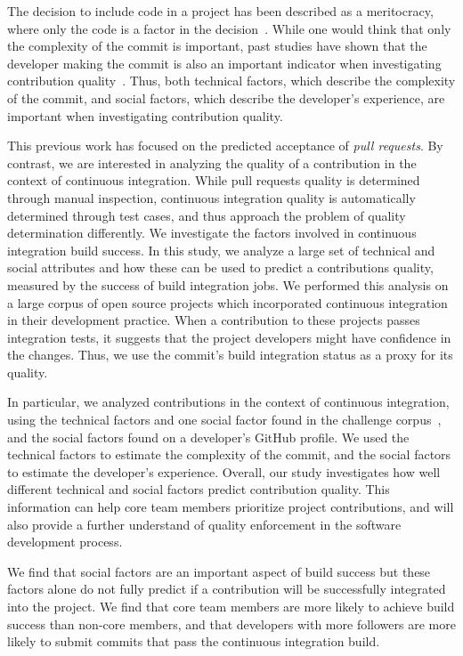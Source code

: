 \documentclass[10pt, conference]{IEEEtran}
\begin{document}
The decision to include code in
a project has been described as a meritocracy, where only the code is a factor
in the decision~\cite{Scacchi07}.
While one would think that only the complexity of the commit is important, past
studies have shown that the developer making the commit is also an important
indicator when investigating contribution quality~\cite{tsay14icse, tasy14fse}.
Thus, both technical factors, which describe the complexity of the commit, and
social factors, which describe the developer's experience, are important when
investigating contribution quality.

This previous work has focused on the predicted acceptance of \emph{pull requests}. 
By contrast,  we are interested in analyzing the quality 
of a contribution in the context of continuous integration.  While pull requests
quality is determined through manual inspection, continuous integration quality
is automatically determined through test cases, and thus approach the problem of
quality determination differently.
We investigate the factors involved in continuous integration build success.
In this study, we analyze a large set of technical and social attributes 
and how these can be used to predict a contributions quality, measured by the
success of build integration jobs.
We performed this analysis on a large corpus of open source projects
which incorporated continuous integration in their development practice. 
When a contribution to these projects passes integration tests, 
it suggests that the project developers
might have confidence in the changes. 
Thus, we use the commit's build integration status as a proxy for its quality.

In particular, we analyzed contributions in the 
context of continuous integration, using the technical factors and one social
factor found in the challenge
corpus~\cite{msr17challenge}, and the social factors found on a developer's
GitHub profile.  We used the technical factors to estimate the complexity of the
commit, and the social factors to estimate the developer's experience.
Overall, our study investigates how well different technical and social factors predict
contribution quality. This information can help core team members prioritize project
contributions, and will also provide a further understand of quality enforcement
in the software development process.

We find that social factors are an important aspect of build success but
these factors alone do not fully predict if a contribution will be successfully 
integrated into the project. We find
that core team members are more likely to achieve build success than non-core
members, and that developers with more followers are more likely to submit commits that pass the
continuous integration build.
\end{document}
